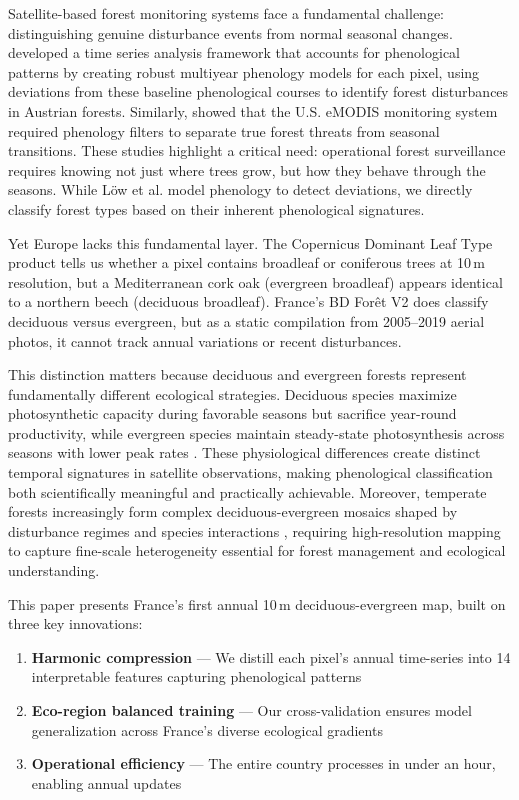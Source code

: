 \documentclass[utf8]{FrontiersinHarvard}
\begin{document}
Satellite-based forest monitoring systems face a fundamental challenge: distinguishing genuine disturbance events from normal seasonal changes. \citet{Low2020} developed a time series analysis framework that accounts for phenological patterns by creating robust multiyear phenology models for each pixel, using deviations from these baseline phenological courses to identify forest disturbances in Austrian forests. Similarly, \citet{Hargrove2009} showed that the U.S. eMODIS monitoring system required phenology filters to separate true forest threats from seasonal transitions. These studies highlight a critical need: operational forest surveillance requires knowing not just where trees grow, but how they behave through the seasons. While Löw et al. model phenology to detect deviations, we directly classify forest types based on their inherent phenological signatures.

Yet Europe lacks this fundamental layer. The Copernicus Dominant Leaf Type product \citep{EU2024a} tells us whether a pixel contains broadleaf or coniferous trees at 10\,m resolution, but a Mediterranean cork oak (evergreen broadleaf) appears identical to a northern beech (deciduous broadleaf). France's BD Forêt V2 \citep{IGN2024} does classify deciduous versus evergreen, but as a static compilation from 2005–2019 aerial photos, it cannot track annual variations or recent disturbances.

This distinction matters because deciduous and evergreen forests represent fundamentally different ecological strategies. Deciduous species maximize photosynthetic capacity during favorable seasons but sacrifice year-round productivity, while evergreen species maintain steady-state photosynthesis across seasons with lower peak rates \citep{JarvisLeverenz1983}. These physiological differences create distinct temporal signatures in satellite observations, making phenological classification both scientifically meaningful and practically achievable. Moreover, temperate forests increasingly form complex deciduous-evergreen mosaics shaped by disturbance regimes and species interactions \citep{Frelich2002}, requiring high-resolution mapping to capture fine-scale heterogeneity essential for forest management and ecological understanding.

This paper presents France's first annual 10\,m deciduous-evergreen map, built on three key innovations:
\begin{enumerate}
    \item \textbf{Harmonic compression} — We distill each pixel's annual time-series into 14 interpretable features capturing phenological patterns
    \item \textbf{Eco-region balanced training} — Our cross-validation ensures model generalization across France's diverse ecological gradients
    \item \textbf{Operational efficiency} — The entire country processes in under an hour, enabling annual updates
\end{enumerate}
\end{document}
